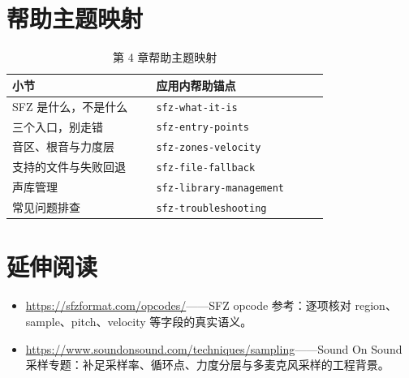 \section{帮助主题映射}

\begin{table}[htbp]
\centering
\small
\begin{tabular}{@{}p{0.40\linewidth}p{0.48\linewidth}@{}}
\hline
小节 & 应用内帮助锚点 \\
\hline
SFZ 是什么，不是什么 & \texttt{sfz-what-it-is} \\
三个入口，别走错 & \texttt{sfz-entry-points} \\
音区、根音与力度层 & \texttt{sfz-zones-velocity} \\
支持的文件与失败回退 & \texttt{sfz-file-fallback} \\
声库管理 & \texttt{sfz-library-management} \\
常见问题排查 & \texttt{sfz-troubleshooting} \\
\hline
\end{tabular}
\caption{第 4 章帮助主题映射}
\end{table}

\section*{延伸阅读}
\begin{itemize}[leftmargin=1.5em]
\item \url{https://sfzformat.com/opcodes/}——SFZ opcode 参考：逐项核对 region、sample、pitch、velocity 等字段的真实语义。
\item \url{https://www.soundonsound.com/techniques/sampling}——Sound On Sound 采样专题：补足采样率、循环点、力度分层与多麦克风采样的工程背景。
\end{itemize}
